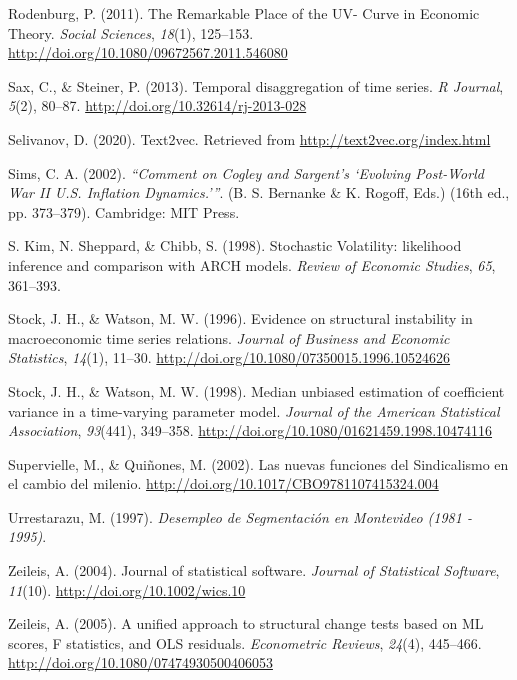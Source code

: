 \documentclass[12pt,oneside]{reedthesis}
\begin{document}
\leavevmode\hypertarget{ref-Rodenburg2007}{}%
Rodenburg, P. (2011). The Remarkable Place of the UV- Curve in Economic Theory. \emph{Social Sciences}, \emph{18}(1), 125--153. \url{http://doi.org/10.1080/09672567.2011.546080}

\leavevmode\hypertarget{ref-Sax2013}{}%
Sax, C., \& Steiner, P. (2013). Temporal disaggregation of time series. \emph{R Journal}, \emph{5}(2), 80--87. \url{http://doi.org/10.32614/rj-2013-028}

\leavevmode\hypertarget{ref-text2vec}{}%
Selivanov, D. (2020). Text2vec. Retrieved from \url{http://text2vec.org/index.html}

\leavevmode\hypertarget{ref-Sims2002}{}%
Sims, C. A. (2002). \emph{``Comment on Cogley and Sargent's `Evolving Post-World War II U.S. Inflation Dynamics.'''}. (B. S. Bernanke \& K. Rogoff, Eds.) (16th ed., pp. 373--379). Cambridge: MIT Press.

\leavevmode\hypertarget{ref-Kim1998}{}%
S. Kim, N. Sheppard, \& Chibb, S. (1998). Stochastic Volatility: likelihood inference and comparison with ARCH models. \emph{Review of Economic Studies}, \emph{65}, 361--393.

\leavevmode\hypertarget{ref-Stock1996}{}%
Stock, J. H., \& Watson, M. W. (1996). Evidence on structural instability in macroeconomic time series relations. \emph{Journal of Business and Economic Statistics}, \emph{14}(1), 11--30. \url{http://doi.org/10.1080/07350015.1996.10524626}

\leavevmode\hypertarget{ref-Stock1998}{}%
Stock, J. H., \& Watson, M. W. (1998). Median unbiased estimation of coefficient variance in a time-varying parameter model. \emph{Journal of the American Statistical Association}, \emph{93}(441), 349--358. \url{http://doi.org/10.1080/01621459.1998.10474116}

\leavevmode\hypertarget{ref-Quinones2001}{}%
Supervielle, M., \& Quiñones, M. (2002). Las nuevas funciones del Sindicalismo en el cambio del milenio. \url{http://doi.org/10.1017/CBO9781107415324.004}

\leavevmode\hypertarget{ref-Urrestarazu1997}{}%
Urrestarazu, M. (1997). \emph{Desempleo de Segmentación en Montevideo (1981 - 1995)}.

\leavevmode\hypertarget{ref-Zeileis2004}{}%
Zeileis, A. (2004). Journal of statistical software. \emph{Journal of Statistical Software}, \emph{11}(10). \url{http://doi.org/10.1002/wics.10}

\leavevmode\hypertarget{ref-Zeileis2005}{}%
Zeileis, A. (2005). A unified approach to structural change tests based on ML scores, F statistics, and OLS residuals. \emph{Econometric Reviews}, \emph{24}(4), 445--466. \url{http://doi.org/10.1080/07474930500406053}
\end{document}
